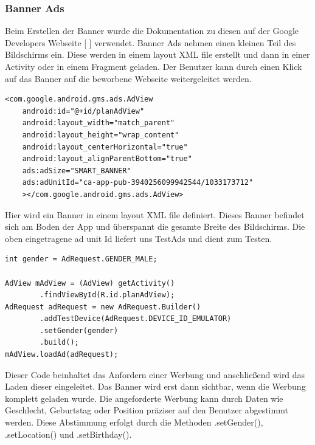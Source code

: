 \documentclass[FIPLY_base.tex]{subfiles}
\begin{document}
\subsubsection{Banner Ads}
Beim Erstellen der Banner wurde die Dokumentation zu diesen auf der Google Developers Webseite [ \cite{gdBanner}] verwendet. \newline 
Banner Ads nehmen einen kleinen Teil des Bildschirms ein. Diese werden in einem layout XML file erstellt und dann in einer Activity oder in einem Fragment geladen. Der Benutzer kann durch einen Klick auf das Banner auf die beworbene Webseite weitergeleitet werden.
\ \\
\begin{lstlisting}
<com.google.android.gms.ads.AdView
    android:id="@+id/planAdView"
    android:layout_width="match_parent"
    android:layout_height="wrap_content"
    android:layout_centerHorizontal="true"
    android:layout_alignParentBottom="true"
    ads:adSize="SMART_BANNER"
    ads:adUnitId="ca-app-pub-3940256099942544/1033173712"
    ></com.google.android.gms.ads.AdView>
\end{lstlisting}
Hier wird ein Banner in einem layout XML file definiert. Dieses Banner befindet sich am Boden der App und überspannt die gesamte Breite des Bildschirms.
Die oben eingetragene ad unit Id liefert uns TestAds und dient zum Testen.
\ \\
\begin{lstlisting}
int gender = AdRequest.GENDER_MALE;

AdView mAdView = (AdView) getActivity()
        .findViewById(R.id.planAdView);
AdRequest adRequest = new AdRequest.Builder()
        .addTestDevice(AdRequest.DEVICE_ID_EMULATOR)
        .setGender(gender)
        .build();
mAdView.loadAd(adRequest);
\end{lstlisting}
Dieser Code beinhaltet das Anfordern einer Werbung und anschließend wird das Laden dieser eingeleitet.
Das Banner wird erst dann sichtbar, wenn die Werbung komplett geladen wurde. %
Die angeforderte Werbung kann durch Daten wie Geschlecht, Geburtstag oder Position präziser auf den Benutzer abgestimmt werden.
Diese Abstimmung erfolgt durch die Methoden .setGender(), .setLocation() und .setBirthday().	

\newpage
\end{document}
